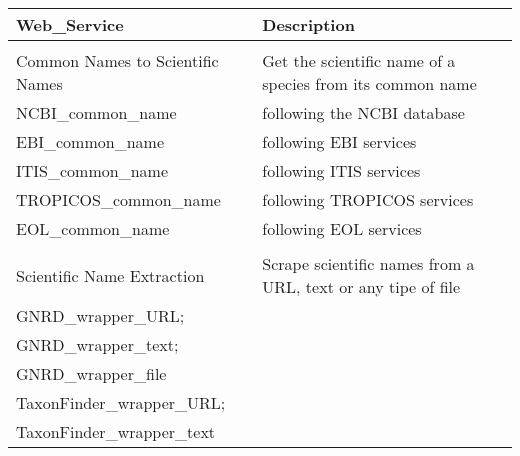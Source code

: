 \documentclass[border=1mm, preview]{standalone}
\begin{document}
\begingroup\fontsize{6}{8}\selectfont

\begin{tabu} to 
\toprule
\textbf{Web\_Service} & \textbf{Description}\\
\midrule
\addlinespace[0.5em]
\\
Common Names to Scientific Names & Get the scientific name of a species from its common name\\

\hspace{1em}NCBI\_common\_name & following the NCBI database\\

\hspace{1em}EBI\_common\_name & following EBI services\\

\hspace{1em}ITIS\_common\_name & following ITIS services\\

\hspace{1em}TROPICOS\_common\_name & following TROPICOS services\\

\hspace{1em}EOL\_common\_name & following EOL services\\

\addlinespace[0.5em]
\\
Scientific Name Extraction & Scrape scientific names from a URL, text or any tipe of file\\

\hspace{1em}GNRD\_wrapper\_URL; & \\

\hspace{1em}GNRD\_wrapper\_text; & \\

\hspace{1em}GNRD\_wrapper\_file & \\

\hspace{1em}TaxonFinder\_wrapper\_URL; & \\

\hspace{1em}TaxonFinder\_wrapper\_text & \\


\end{tabu}
\end{document}

